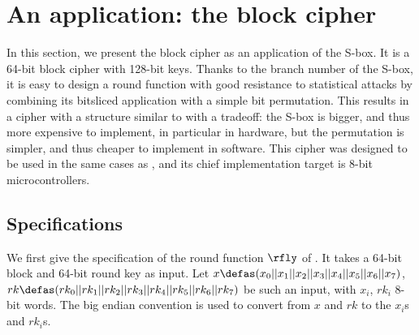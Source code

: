 \section{An application: the \littlunpride block cipher}
\label{sec:fly}

In this section, we present the \fly block cipher as an application of the \littlunOne S-box. It is a 64-bit
block cipher with 128-bit keys.
Thanks to the branch
number of the S-box, it is easy to design a round function with good resistance to statistical attacks by combining
its bitsliced application with a simple bit permutation. This results in a cipher with a structure similar to \present \cite{present}
with a tradeoff: the S-box is bigger, and thus more expensive to implement, in particular in hardware, but the
permutation is simpler, and thus cheaper to implement in software.
This cipher was designed to be used in the same cases as \pride, and its chief implementation target is 8-bit microcontrollers.

\subsection{Specifications}

We first give the specification of the round function $\rfly$ of \fly. It takes a 64-bit block and 64-bit round key as input.
Let $x \defas (x_0||x_1||x_2||x_3||x_4||x_5||x_6||x_7)$, $rk \defas (rk_0||rk_1||rk_2||rk_3||rk_4||rk_5||rk_6|| rk_7)$ be such
an input, with $x_i$, $rk_i$ 8-bit words. The big endian convention is used to convert from $x$ and $rk$ to the $x_i$s and $rk_i$s.

